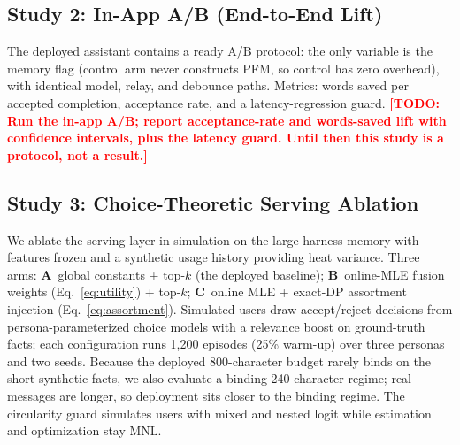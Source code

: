 \documentclass[letterpaper]{article}
\newcommand{\todo}[1]{\textbf{\textcolor{red}{[TODO: #1]}}}
\begin{document}
\subsection{Study 2: In-App A/B (End-to-End Lift)}

The deployed assistant contains a ready A/B protocol: the only variable
is the memory flag (control arm never constructs PFM, so control has
zero overhead), with identical model, relay, and debounce paths.
Metrics: words saved per accepted completion, acceptance rate, and a
latency-regression guard.
\todo{Run the in-app A/B; report acceptance-rate and words-saved lift
with confidence intervals, plus the latency guard. Until then this study
is a protocol, not a result.}

\subsection{Study 3: Choice-Theoretic Serving Ablation}

We ablate the serving layer in simulation on the large-harness memory
with features frozen and a synthetic usage history providing heat
variance. Three arms: \textbf{A}~global constants + top-$k$ (the deployed
baseline); \textbf{B}~online-MLE fusion weights (Eq.~\ref{eq:utility}) +
top-$k$; \textbf{C}~online MLE + exact-DP assortment injection
(Eq.~\ref{eq:assortment}). Simulated users draw accept/reject decisions
from persona-parameterized choice models with a relevance boost on
ground-truth facts; each configuration runs 1{,}200 episodes (25\%
warm-up) over three personas and two seeds. Because the deployed
800-character budget rarely binds on the short synthetic facts, we also
evaluate a binding 240-character regime; real messages are longer, so
deployment sits closer to the binding regime. The circularity guard
simulates users with mixed and nested logit while estimation and
optimization stay MNL.
\end{document}
